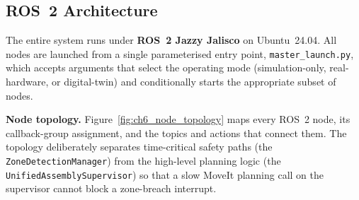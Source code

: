 \subsection{ROS~2 Architecture}
\label{subsec:ch6_ros2}

The entire system runs under \textbf{ROS~2 Jazzy Jalisco} on Ubuntu~24.04.  All nodes are
launched from a single parameterised entry point, \texttt{master\_launch.py}, which accepts
arguments that select the operating mode (simulation-only, real-hardware, or digital-twin) and
conditionally starts the appropriate subset of nodes.

\textbf{Node topology.} Figure~\ref{fig:ch6_node_topology} maps every ROS~2 node, its callback-group assignment, and
the topics and actions that connect them.  The topology deliberately separates
time-critical safety paths (the \texttt{ZoneDetectionManager}) from the high-level planning
logic (the \texttt{UnifiedAssemblySupervisor}) so that a slow MoveIt planning call on the
supervisor cannot block a zone-breach interrupt.

